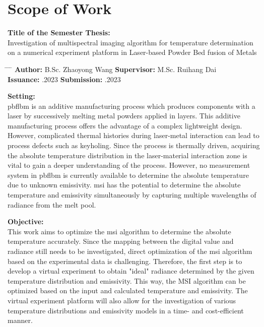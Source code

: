 \chapter*{Scope of Work}



\textbf{Title of the Semester Thesis:}\\
\Large{Investigation of multispectral imaging algorithm for temperature
determination on a numerical experiment platform in Laser-based 
Powder Bed fusion of Metals}\\
\normalsize

\begin{tabbing}
	\hspace{7em} 		\= \hspace{13em}			\= \hspace{7em} 		\= \kill
	\textbf{Author:}  \> B.Sc. Zhaoyong Wang 	\> \textbf{Supervisor:} 	\>  M.Sc. Ruihang Dai \\
	\textbf{Issuance:} 	.2023 	\> \textbf{Submission:} 	.2023
\end{tabbing}

\textbf{Setting:}\\
\gls{pbflbm} is an additive manufacturing
process which produces components with a laser by successively melting metal
powders applied in layers. This additive manufacturing process offers the advantage
of a complex lightweight design. However, complicated thermal histories
during laser-metal interaction can lead to process defects such as keyholing. Since
the process is thermally driven, acquiring the absolute temperature distribution in
the laser-material interaction zone is vital to gain a deeper understanding of the
process. However, no measurement system in \gls{pbflbm} is currently available to
determine the absolute temperature due to unknown emissivity. \gls{msi} has the 
potential to determine the absolute temperature and emissivity
simultaneously by capturing multiple wavelengths of radiance from the melt pool.


\textbf{Objective:}\\
This work aims to optimize the \gls{msi} algorithm to determine the absolute temperature
accurately. Since the mapping between the digital value and radiance still
needs to be investigated, direct optimization of the \gls{msi} algorithm based on the experimental
data is challenging. Therefore, the first step is to develop a virtual experiment
to obtain "ideal" radiance determined by the given temperature distribution
and emissivity. This way, the MSI algorithm can be optimized based on the input
and calculated temperature and emissivity. The virtual experiment platform will also
allow for the investigation of various temperature distributions and emissivity models
in a time- and cost-efficient manner.%

